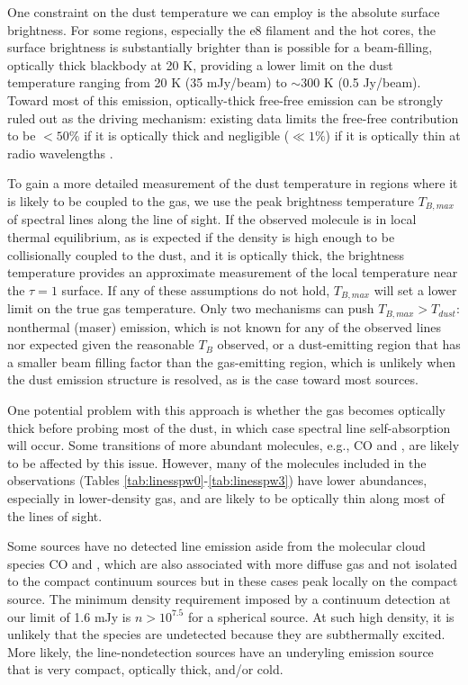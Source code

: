 \documentclass[twocolumn]{aastex61}
\begin{document}
One constraint on the dust temperature we can employ is the absolute surface
brightness.  For some regions, especially the e8 filament and the hot cores,
the surface brightness is substantially
brighter than is possible for a beam-filling, optically thick blackbody at 20
K, providing a lower limit on the dust temperature ranging from 20 K (35
mJy/beam) to $\sim300$ K (0.5 Jy/beam).  Toward most of this emission, optically-thick
free-free emission can be strongly ruled out as the driving mechanism: 
existing data limits the free-free contribution to be $<50\%$ if it is
optically thick and negligible ($\ll1\%$) if it is optically thin at radio
wavelengths \citep{Ginsburg2016b, Goddi2016a}.

To gain a more detailed measurement of the dust temperature in regions where it
is likely to be coupled to the gas, we use the peak brightness temperature
$T_{B,max}$ of spectral lines along the line of sight.  If the observed
molecule is in local thermal equilibrium, as is expected if the density is high
enough to be collisionally coupled to the dust, and it is optically thick, the
brightness temperature provides an approximate measurement of the local
temperature near the $\tau=1$ surface.  If any of these assumptions do not
hold, $T_{B,max}$ will set a lower limit on the true gas temperature.  Only 
two mechanisms can push $T_{B,max} > T_{dust}$: nonthermal (maser) emission, which
is not known for any of the observed lines nor expected given the reasonable
$T_B$ observed, or a dust-emitting region that has a smaller beam filling
factor than the gas-emitting region, which is unlikely when the dust emission
structure is resolved, as is the case toward most sources.

One potential problem with this approach is whether the gas becomes optically thick
before probing most of the dust, in which case spectral line self-absorption
will occur.  Some transitions of more abundant molecules, e.g., CO and
\formaldehyde, are likely to be affected by this issue.  However, many of the
molecules included in the observations (Tables
\ref{tab:linesspw0}-\ref{tab:linesspw3}) have lower abundances, especially in
lower-density gas, and are likely to be optically thin along most of the lines
of sight.

Some sources have no detected line emission aside from the molecular cloud
species CO and \formaldehyde, which are also associated with more diffuse gas
and not isolated to the compact continuum sources but in these cases peak
locally on the compact source.  The minimum density requirement imposed by a
continuum detection at our limit of 1.6 mJy is $n>10^{7.5}$ \percc for a
spherical source.  At such high density, it is unlikely that the species are
undetected because they are subthermally excited.  More likely, the
line-nondetection sources have an underyling emission source that is very
compact, optically thick, and/or cold.
\end{document}
